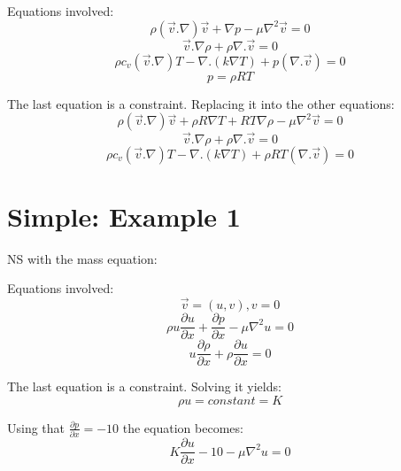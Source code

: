 \documentclass[11pt,letterpaper]{article}
\begin{document}
Equations involved:
\begin{equation}
\rho (\vec{v}.\nabla)\vec{v} + \nabla p - \mu \nabla^{2}\vec{v} = 0
\end{equation}
\begin{equation}
\vec{v}.\nabla\rho+\rho\nabla.\vec{v}=0
\end{equation}
\begin{equation}
\rho c_{v} (\vec{v}.\nabla) T - \nabla .(k\nabla T) + p (\nabla . \vec{v})= 0
\end{equation}
\begin{equation}
p = \rho R T
\end{equation}

The last equation is a constraint. Replacing it into the other equations:
\begin{equation}
\rho (\vec{v}.\nabla)\vec{v} + \rho R \nabla T + R T \nabla \rho - \mu \nabla^{2}\vec{v} = 0
\end{equation}
\begin{equation}
\vec{v}.\nabla\rho+\rho\nabla.\vec{v}=0
\end{equation}
\begin{equation}
\rho c_{v} (\vec{v}.\nabla) T - \nabla .(k\nabla T) + \rho R T (\nabla . \vec{v})= 0
\end{equation}

\section{Simple: Example 1}

NS with the mass equation:

Equations involved:
\begin{equation}
\vec{v}=(u,v), v = 0
\end{equation}
\begin{equation}
\rho u\frac{\partial u}{\partial x} + \frac{\partial p}{\partial x} - \mu \nabla^{2}u = 0
\end{equation}
\begin{equation}
u \frac{\partial \rho}{\partial x} + \rho \frac{\partial u}{\partial x}=0
\end{equation}

The last equation is a constraint. Solving it yields:
\begin{equation}
\rho u = constant = K
\end{equation}

Using that $\frac{\partial p}{\partial x}=-10$ the equation becomes:
\begin{equation}
K\frac{\partial u}{\partial x} -10 - \mu \nabla^{2}u = 0
\end{equation}
\end{document}
